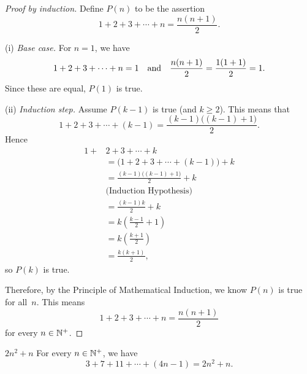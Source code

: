 \documentclass[../MATH-2000-Notes.tex]{subfiles}
\begin{document}
\begin{proof}[Proof by induction]
    Define $P(n)$ to be the assertion
    $$ 1 + 2 + 3 + \cdots + n = \frac{n(n+1)}{2} .$$

    (i) \emph{Base case.} For $n = 1$, we have
    $$1 + 2 + 3 + \cdots + n = 1 \mbox{\quad and\quad}  \frac{n(n+1)}{2}=\frac{1(1+1)}{2}=1.$$
    Since these are equal,
    $P(1)$ is true.

    \medbreak
    (ii) \emph{Induction step.} Assume $P(k-1)$ is true (and $k \ge 2$). This means that
    $$ 1 + 2 + 3 + \cdots + (k-1) = \frac{(k-1)\bigl( (k-1)+1\bigr)}{2} .$$
    Hence
    \begin{align*}
        1 + {} & 2 + 3 + \cdots + k
        \\&= \bigl(1 + 2 + 3 + \cdots + (k-1) \bigr) + k
        \\&= \frac{(k-1)\bigl( (k-1)+1\bigr)}{2} + k 
        \\& \text{(Induction Hypothesis)}
        \\&= \frac{(k-1)k}{2} + k
        \\&= k \left( \frac{k-1}{2} + 1 \right)
        \\&= k \left( \frac{k+1}{2} \right)
        \\&= \frac{k (k+1)}{2}
        ,\end{align*}
    so $P(k)$ is true.

    Therefore, by the Principle of Mathematical Induction, we know $P(n)$ is true for all~$n$. This means
    $$ 1 + 2 + 3 + \cdots + n = \frac{n(n+1)}{2} $$
    for every $n \in \mathbb{N}^+$.
\end{proof}

\begin{Proposition}
    {\(2n^2 + n\)}
    For every $n \in \mathbb{N}^+$, we have
    $$ 3 + 7 + 11 + \cdots + (4n-1) = 2n^2 + n .$$
\end{Proposition}
\end{document}
